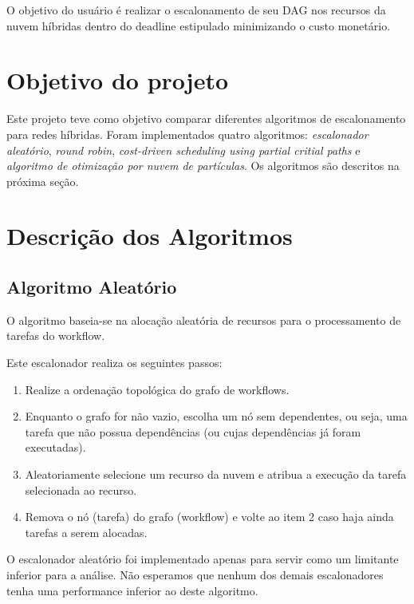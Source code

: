 \documentclass[a4paper,10pt]{article}
\begin{document}
O objetivo do usuário é realizar o escalonamento de seu DAG nos recursos da 
nuvem híbridas dentro do deadline estipulado minimizando o custo monetário.

\section{Objetivo do projeto}

Este projeto teve como objetivo comparar diferentes algoritmos de escalonamento 
para redes híbridas. Foram implementados quatro algoritmos: \emph{escalonador aleatório}, \emph{round robin},
\emph{cost-driven scheduling using partial critial paths} e \emph{algoritmo de otimização por nuvem de partículas}.
Os algoritmos são descritos na próxima seção.

\section{Descrição dos Algoritmos}
\label{algoritmos}

\subsection{Algoritmo Aleatório}

O algoritmo baseia-se na alocação aleatória de recursos para o processamento de tarefas do workflow.

Este escalonador realiza os seguintes passos:

\begin{enumerate}

    \item Realize a ordenação topológica do grafo de workflows.

    \item Enquanto o grafo for não vazio, escolha um nó sem dependentes, ou seja, uma tarefa que não possua dependências 
(ou cujas dependências já foram executadas).

    \item Aleatoriamente selecione um recurso da nuvem e atribua a execução da tarefa selecionada ao recurso.

    \item Remova o nó (tarefa) do grafo (workflow) e volte ao item 2 caso haja ainda tarefas a serem alocadas.

\end{enumerate}

O escalonador aleatório foi implementado apenas para servir como um limitante inferior para a análise.
Não esperamos que nenhum dos demais escalonadores tenha uma performance inferior ao deste algoritmo.
\end{document}
